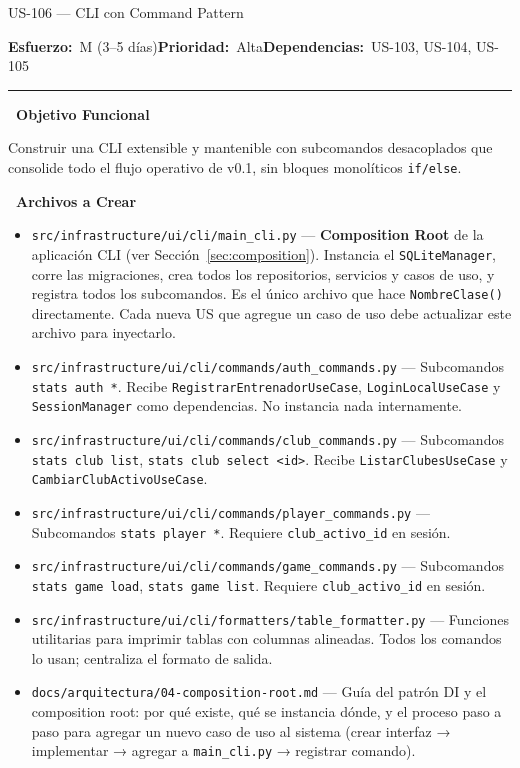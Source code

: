 \documentclass[11pt,a4paper]{article}
\newcommand{\fpath}[1]{\texttt{\small #1}}
\newcommand{\usfield}[2][\;]{%
  \par\vspace{5pt}%
  {\small\textbf{\textcolor{primary}{#2}}}\par\vspace{2pt}%
}
\newcommand{\usmeta}[3]{%
  \vspace{2pt}%
  {\small\textcolor{secondary}{%
    \textbf{Esfuerzo:}~#1\quad\textbf{Prioridad:}~#2\quad\textbf{Dependencias:}~#3%
  }}%
  \par\vspace{4pt}%
  \textcolor{bordergray}{\rule{\linewidth}{0.4pt}}\par\vspace{4pt}%
}
\begin{document}
\begin{uscard}{US-106 — CLI con Command Pattern}

\usmeta{M (3–5 días)}{Alta}{US-103, US-104, US-105}

\usfield{\faAlignLeft\ Objetivo Funcional}
Construir una CLI extensible y mantenible con subcomandos desacoplados que consolide todo el flujo operativo de v0.1, sin bloques monolíticos \fpath{if/else}.

\usfield{\faFolderOpen\ Archivos a Crear}
\begin{itemize}[nosep, leftmargin=1.6em]
  \item \fpath{src/infrastructure/ui/cli/main\_cli.py} — \textbf{Composition Root} de la aplicación CLI (ver Sección~\ref{sec:composition}). Instancia el \fpath{SQLiteManager}, corre las migraciones, crea todos los repositorios, servicios y casos de uso, y registra todos los subcomandos. Es el único archivo que hace \fpath{NombreClase()} directamente. Cada nueva US que agregue un caso de uso debe actualizar este archivo para inyectarlo.
  \item \fpath{src/infrastructure/ui/cli/commands/auth\_commands.py} — Subcomandos \fpath{stats auth *}. Recibe \fpath{RegistrarEntrenadorUseCase}, \fpath{LoginLocalUseCase} y \fpath{SessionManager} como dependencias. No instancia nada internamente.
  \item \fpath{src/infrastructure/ui/cli/commands/club\_commands.py} — Subcomandos \fpath{stats club list}, \fpath{stats club select <id>}. Recibe \fpath{ListarClubesUseCase} y \fpath{CambiarClubActivoUseCase}.
  \item \fpath{src/infrastructure/ui/cli/commands/player\_commands.py} — Subcomandos \fpath{stats player *}. Requiere \fpath{club\_activo\_id} en sesión.
  \item \fpath{src/infrastructure/ui/cli/commands/game\_commands.py} — Subcomandos \fpath{stats game load}, \fpath{stats game list}. Requiere \fpath{club\_activo\_id} en sesión.
  \item \fpath{src/infrastructure/ui/cli/formatters/table\_formatter.py} — Funciones utilitarias para imprimir tablas con columnas alineadas. Todos los comandos lo usan; centraliza el formato de salida.
  \item \fpath{docs/arquitectura/04-composition-root.md} — Guía del patrón DI y el composition root: por qué existe, qué se instancia dónde, y el proceso paso a paso para agregar un nuevo caso de uso al sistema (crear interfaz → implementar → agregar a \fpath{main\_cli.py} → registrar comando).
\end{itemize}


\end{uscard}
\end{document}
